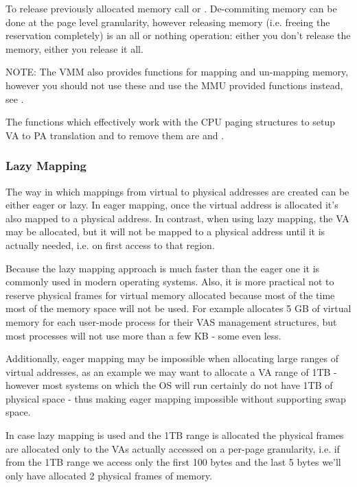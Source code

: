 \begin{appendices}
To release previously allocated memory call  or . De-commiting
memory can be done at the page level granularity, however releasing memory (i.e. freeing the 
reservation completely) is an all or nothing operation: either you don't release the memory, either
you release it all.

NOTE: The VMM also provides functions for mapping and un-mapping memory, however you should not use
these and use the MMU provided functions instead, see .

The functions which effectively work with the CPU paging structures to setup VA to PA translation
and to remove them are  and .

\subsubsection{Lazy Mapping}
\label{sect:LazyMapping}

The way in which mappings from virtual to physical addresses are created can be either eager or lazy.
In eager mapping, once the virtual address is allocated it's also mapped to a physical address. In
contrast, when using lazy mapping, the VA may be allocated, but it will not be mapped to a physical
address until it is actually needed, i.e. on first access to that region.

Because the lazy mapping approach is much faster than the eager one it is commonly used in modern
operating systems. Also, it is more practical not to reserve physical frames for virtual memory
allocated because most of the time most of the memory space will not be used. For example
\projectname allocates 5 GB of virtual memory for each user-mode process for their VAS management
structures, but most processes will not use more than a few KB - some even less.

Additionally, eager mapping may be impossible when allocating large ranges of virtual
addresses, as an example we may want to allocate a VA range of 1TB - however most systems on which
the OS will run certainly do not have 1TB of physical space - thus making eager mapping impossible
without supporting swap space.

In case lazy mapping is used and the 1TB range is allocated the physical frames are allocated only
to the VAs actually accessed on a per-page granularity, i.e. if from the 1TB range we access only
the first 100 bytes and the last 5 bytes we'll only have allocated 2 physical frames of memory.


\end{appendices}
